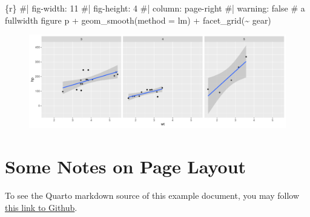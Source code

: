 \documentclass[
  letterpaper,
  DIV=11,
  numbers=noendperiod,
  oneside]{scrartcl}
\newenvironment{Shaded}{\begin{snugshade}}{\end{snugshade}}
\newcommand{\AttributeTok}[1]{\textcolor[rgb]{0.40,0.45,0.13}{#1}}
\newcommand{\CommentTok}[1]{\textcolor[rgb]{0.37,0.37,0.37}{#1}}
\newcommand{\FunctionTok}[1]{\textcolor[rgb]{0.28,0.35,0.67}{#1}}
\newcommand{\InformationTok}[1]{\textcolor[rgb]{0.37,0.37,0.37}{#1}}
\newcommand{\NormalTok}[1]{\textcolor[rgb]{0.00,0.23,0.31}{#1}}
\newcommand{\SpecialCharTok}[1]{\textcolor[rgb]{0.37,0.37,0.37}{#1}}
\newcommand{\StringTok}[1]{\textcolor[rgb]{0.13,0.47,0.30}{#1}}
\begin{document}
\begin{Shaded}
\begin{Highlighting}[]
\InformationTok{\textasciigrave{}\textasciigrave{}\textasciigrave{}\{r\}}
\CommentTok{\#| fig{-}width: 11}
\CommentTok{\#| fig{-}height: 4}
\CommentTok{\#| column: page{-}right}
\CommentTok{\#| warning: false}
\CommentTok{\# a fullwidth figure}
\NormalTok{p }\SpecialCharTok{+} \FunctionTok{geom\_smooth}\NormalTok{(}\AttributeTok{method =} \StringTok{\textquotesingle{}lm\textquotesingle{}}\NormalTok{) }\SpecialCharTok{+} \FunctionTok{facet\_grid}\NormalTok{(}\SpecialCharTok{\textasciitilde{}}\NormalTok{ gear)}
\InformationTok{\textasciigrave{}\textasciigrave{}\textasciigrave{}}
\end{Highlighting}
\end{Shaded}

\begin{figure}[H]

{\centering \includegraphics{HousePrices_files/figure-pdf/unnamed-chunk-13-1.pdf}

}

\end{figure}

\hypertarget{some-notes-on-page-layout}{%
\section{Some Notes on Page Layout}\label{some-notes-on-page-layout}}

To see the Quarto markdown source of this example document, you may
follow
\href{https://raw.githubusercontent.com/quarto-dev/quarto-gallery/main/page-layout/tufte.qmd}{this
link to Github}.
\end{document}
